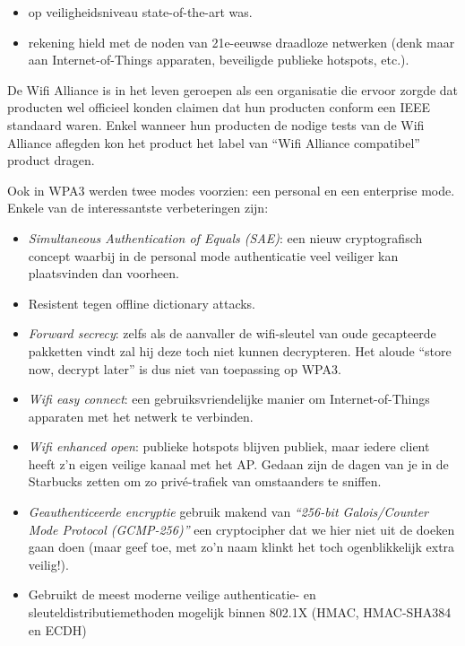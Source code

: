 \documentclass[
  10pt,
  dutch,
  paper=a4,
  ,captions=tableheading
]{scrbook}
\providecommand{\tightlist}{%
  \setlength{\itemsep}{0pt}\setlength{\parskip}{0pt}}
\begin{document}
\begin{itemize}
\tightlist
\item
  op veiligheidsniveau state-of-the-art was.
\item
  rekening hield met de noden van 21e-eeuwse draadloze netwerken (denk
  maar aan Internet-of-Things apparaten, beveiligde publieke hotspots,
  etc.).
\end{itemize}

\begin{tipblock}
De Wifi Alliance is in het leven geroepen als een organisatie die ervoor
zorgde dat producten wel officieel konden claimen dat hun producten
conform een IEEE standaard waren. Enkel wanneer hun producten de nodige
tests van de Wifi Alliance aflegden kon het product het label van ``Wifi
Alliance compatibel'' product dragen.
\end{tipblock}

Ook in WPA3 werden twee modes voorzien: een personal en een enterprise
mode. Enkele van de interessantste verbeteringen zijn:

\begin{itemize}
\tightlist
\item
  \emph{Simultaneous Authentication of Equals (SAE)}: een nieuw
  cryptografisch concept waarbij in de personal mode authenticatie veel
  veiliger kan plaatsvinden dan voorheen.
\item
  Resistent tegen offline dictionary attacks.
\item
  \emph{Forward secrecy}: zelfs als de aanvaller de wifi-sleutel van
  oude gecapteerde pakketten vindt zal hij deze toch niet kunnen
  decrypteren. Het aloude ``store now, decrypt later'' is dus niet van
  toepassing op WPA3.
\item
  \emph{Wifi easy connect}: een gebruiksvriendelijke manier om
  Internet-of-Things apparaten met het netwerk te verbinden.
\item
  \emph{Wifi enhanced open}: publieke hotspots blijven publiek, maar
  iedere client heeft z'n eigen veilige kanaal met het AP. Gedaan zijn
  de dagen van je in de Starbucks zetten om zo privé-trafiek van
  omstaanders te sniffen.
\item
  \emph{Geauthenticeerde encryptie} gebruik makend van \emph{``256-bit
  Galois/Counter Mode Protocol (GCMP-256)''} een cryptocipher dat we
  hier niet uit de doeken gaan doen (maar geef toe, met zo'n naam klinkt
  het toch ogenblikkelijk extra veilig!).
\item
  Gebruikt de meest moderne veilige authenticatie- en
  sleuteldistributiemethoden mogelijk binnen 802.1X (HMAC, HMAC-SHA384
  en ECDH)
\end{itemize}
\end{document}
